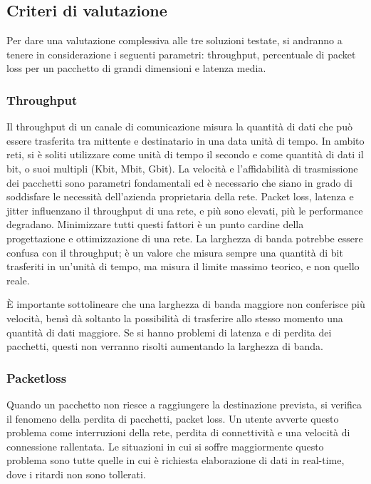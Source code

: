 \subsection{Criteri di valutazione}
Per dare una valutazione complessiva alle tre soluzioni testate, si andranno a tenere in considerazione i seguenti parametri: throughput, percentuale di packet loss per un pacchetto di grandi dimensioni e latenza media.

\subsubsection{Throughput}
Il throughput di un canale di comunicazione misura la quantità di dati che può essere trasferita tra mittente e destinatario in una data unità di tempo. In ambito reti, si è soliti utilizzare come unità di tempo il secondo e come quantità di dati il bit, o suoi multipli (Kbit, Mbit, Gbit).
La velocità e l'affidabilità di trasmissione dei pacchetti sono parametri fondamentali ed è necessario che siano in grado di soddisfare le necessità dell'azienda proprietaria della rete. Packet loss, latenza e jitter influenzano il throughput di una rete, e più sono elevati, più le performance degradano. Minimizzare tutti questi fattori è un punto cardine della progettazione e ottimizzazione di una rete.
La larghezza di banda potrebbe essere confusa con il throughput; è un valore che misura sempre una quantità di bit trasferiti in un'unità di tempo, ma misura il limite massimo teorico, e non quello reale.

È importante sottolineare che una larghezza di banda maggiore non conferisce più velocità, bensì dà soltanto la possibilità di trasferire allo stesso momento una quantità di dati maggiore. Se si hanno problemi di latenza e di perdita dei pacchetti, questi non verranno risolti aumentando la larghezza di banda.


\subsubsection{Packetloss}
Quando un pacchetto non riesce a raggiungere la destinazione prevista, si verifica il fenomeno della perdita di pacchetti, packet loss.
Un utente avverte questo problema come interruzioni della rete, perdita di connettività e una velocità di connessione rallentata.
Le situazioni in cui si soffre maggiormente questo problema sono tutte quelle in cui è richiesta elaborazione di dati in real-time, dove i ritardi non sono tollerati.

